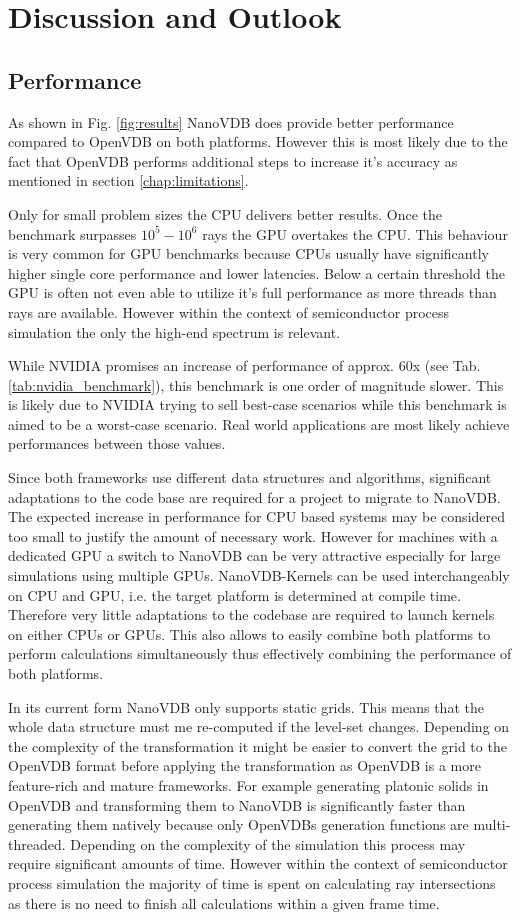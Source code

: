 \section{Discussion and Outlook}
\subsection{Performance}
As shown in Fig. \ref{fig:results} NanoVDB does provide better performance compared to OpenVDB on both platforms.
However this is most likely due to the fact that OpenVDB performs additional steps to increase it's accuracy as mentioned in section \ref{chap:limitations}.

Only for small problem sizes the CPU delivers better results.
Once the benchmark surpasses $10^5 - 10^6$ rays the GPU overtakes the CPU.
This behaviour is very common for GPU benchmarks because CPUs usually have significantly higher single core performance and lower latencies.
Below a certain threshold the GPU is often not even able to utilize it's full performance as more threads than rays are available.
However within the context of semiconductor process simulation the only the high-end spectrum is relevant.

While NVIDIA promises an increase of performance of approx. 60x (see Tab. \ref{tab:nvidia_benchmark}), this benchmark is one order of magnitude slower.
This is likely due to NVIDIA trying to sell best-case scenarios while this benchmark is aimed to be a worst-case scenario.
Real world applications are most likely achieve performances between those values.

Since both frameworks use different data structures and algorithms, significant adaptations to the code base are required for a project to migrate to NanoVDB.
The expected increase in performance for CPU based systems may be considered too small to justify the amount of necessary work.
However for machines with a dedicated GPU a switch to NanoVDB can be very attractive especially for large simulations using multiple GPUs.
NanoVDB-Kernels can be used interchangeably on CPU and GPU, i.e. the target platform is determined at compile time.
Therefore very little adaptations to the codebase are required to launch kernels on either CPUs or GPUs.
This also allows to easily combine both platforms to perform calculations simultaneously thus effectively combining the performance of both platforms.

In its current form NanoVDB only supports static grids.
This means that the whole data structure must me re-computed if the level-set changes.
Depending on the complexity of the transformation it might be easier to convert the grid to the OpenVDB format before applying the transformation as OpenVDB is a more feature-rich and mature frameworks.
For example generating platonic solids in OpenVDB and transforming them to NanoVDB is significantly faster than generating them natively because only OpenVDBs generation functions are multi-threaded.
Depending on the complexity of the simulation this process may require significant amounts of time.
However within the context of semiconductor process simulation the majority of time is spent on calculating ray intersections as there is no need to finish all calculations within a given frame time.

